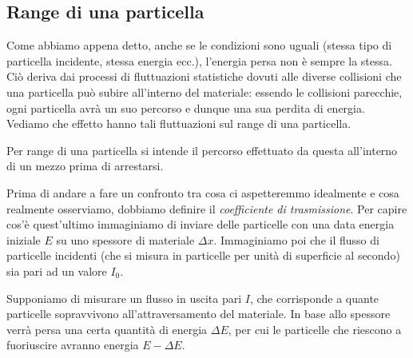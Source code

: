 \subsection{Range di una particella}

Come abbiamo appena detto, anche se le condizioni sono uguali (stessa tipo di particella incidente, stessa energia ecc.), l'energia persa non è sempre la stessa. Ciò deriva dai processi di fluttuazioni statistiche dovuti alle diverse collisioni che una particella può subire all'interno del materiale: essendo le collisioni parecchie, ogni particella avrà un suo percorso e dunque una sua perdita di energia. Vediamo che effetto hanno tali fluttuazioni sul range di una particella.

Per range di una particella si intende il percorso effettuato da questa all'interno di un mezzo prima di arrestarsi.

Prima di andare a fare un confronto tra cosa ci aspetteremmo idealmente e cosa realmente osserviamo, dobbiamo definire il \textit{coefficiente di trasmissione}. Per capire cos'è quest'ultimo immaginiamo di inviare delle particelle con una data energia iniziale $E$ su uno spessore di materiale $\Delta x$. Immaginiamo poi che il flusso di particelle incidenti (che si misura in particelle per unità di superficie al secondo) sia pari ad un valore $I_0$.

\begin{minipage}{0.295\textwidth}
    \begin{figure}[H]
        \centering
    \end{figure}
\end{minipage}
\begin{minipage}{0.7\textwidth}
    \vspace{0.2cm}Supponiamo di misurare un flusso in uscita pari $I$, che corrisponde a quante particelle sopravvivono all'attraversamento del materiale. In base allo spessore verrà persa una certa quantità di energia $\Delta E$, per cui le particelle che riescono a fuoriuscire avranno energia $E - \Delta E$.
\end{minipage}


